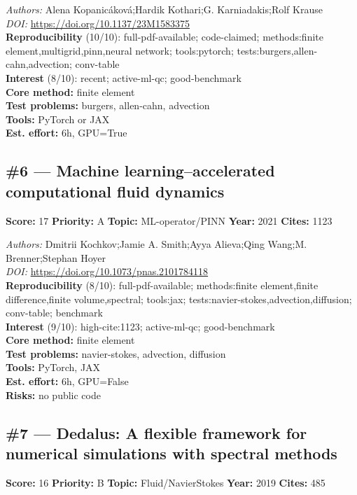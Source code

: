 \documentclass[10pt,letterpaper]{article}
\begin{document}
\textit{Authors:} Alena Kopanicáková;Hardik Kothari;G. Karniadakis;Rolf Krause \\ 
\textit{DOI:} \url{https://doi.org/10.1137/23M1583375} \\ 
\textbf{Reproducibility } (10/10): full-pdf-available; code-claimed; methods:finite element,multigrid,pinn,neural network; tools:pytorch; tests:burgers,allen-cahn,advection; conv-table \\ 
\textbf{Interest } (8/10): recent; active-ml-qc; good-benchmark \\ 
\textbf{Core method:} finite element \\ 
\textbf{Test problems:} burgers, allen-cahn, advection \\ 
\textbf{Tools:} PyTorch or JAX \\ 
\textbf{Est. effort:} 6h, GPU=True \\ 

\subsection*{\#6 — Machine learning–accelerated computational fluid dynamics}
\textbf{Score:} 17 \quad \textbf{Priority:} A \quad \textbf{Topic:} ML-operator/PINN \quad \textbf{Year:} 2021 \quad \textbf{Cites:} 1123

\textit{Authors:} Dmitrii Kochkov;Jamie A. Smith;Ayya Alieva;Qing Wang;M. Brenner;Stephan Hoyer \\ 
\textit{DOI:} \url{https://doi.org/10.1073/pnas.2101784118} \\ 
\textbf{Reproducibility } (8/10): full-pdf-available; methods:finite element,finite difference,finite volume,spectral; tools:jax; tests:navier-stokes,advection,diffusion; conv-table; benchmark \\ 
\textbf{Interest } (9/10): high-cite:1123; active-ml-qc; good-benchmark \\ 
\textbf{Core method:} finite element \\ 
\textbf{Test problems:} navier-stokes, advection, diffusion \\ 
\textbf{Tools:} PyTorch, JAX \\ 
\textbf{Est. effort:} 6h, GPU=False \\ 
\textbf{Risks:} no public code \\ 

\subsection*{\#7 — Dedalus: A flexible framework for numerical simulations with spectral methods}
\textbf{Score:} 16 \quad \textbf{Priority:} B \quad \textbf{Topic:} Fluid/NavierStokes \quad \textbf{Year:} 2019 \quad \textbf{Cites:} 485
\end{document}

